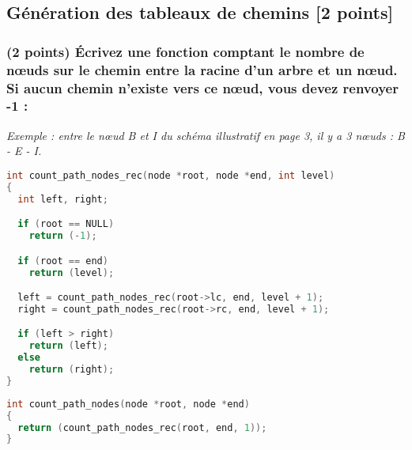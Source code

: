 \documentclass[11pt,a4paper]{article}
\begin{document}
\clearpage


\subsection{Génération des tableaux de chemins [2 points]}

%


\subsubsection{(2 points) \'Ecrivez une fonction comptant le nombre de nœuds sur le chemin entre la racine d'un arbre et un nœud. Si aucun chemin n'existe vers ce nœud, vous devez renvoyer -1 : }

\noindent \textit{Exemple : entre le nœud B et I du schéma illustratif en page 3, il y a 3 nœuds : B - E - I.}

\begin{center}
\begin{lstlisting}[language=C]
int count_path_nodes_rec(node *root, node *end, int level)
{
  int left, right;

  if (root == NULL)
    return (-1);

  if (root == end)
    return (level);

  left = count_path_nodes_rec(root->lc, end, level + 1);
  right = count_path_nodes_rec(root->rc, end, level + 1);

  if (left > right)
    return (left);
  else
    return (right);
}
\end{lstlisting}

\begin{lstlisting}[language=C]
int count_path_nodes(node *root, node *end)
{
  return (count_path_nodes_rec(root, end, 1));
}
\end{lstlisting}
\end{center}


\clearpage
\end{document}
